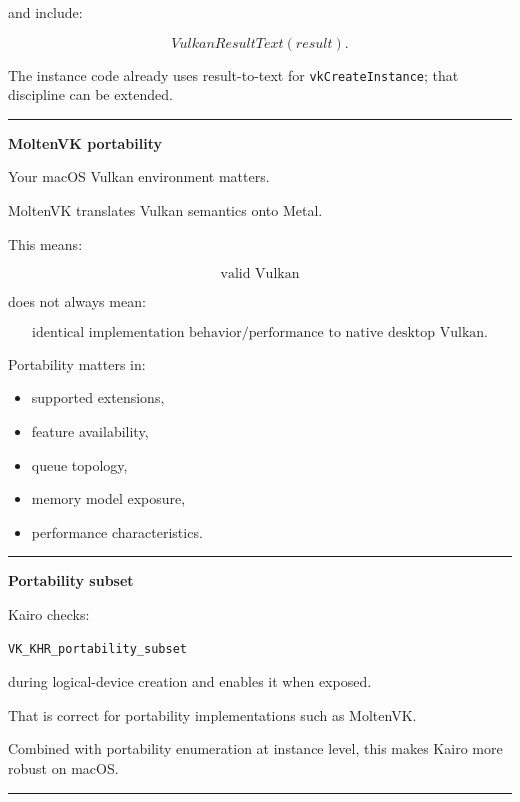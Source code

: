 and include:

\[
VulkanResultText(result).
\]

The instance code already uses result-to-text for \texttt{vkCreateInstance}; that discipline can be extended.

\begin{center}\rule{0.5\linewidth}{0.5pt}\end{center}

\textbf{MoltenVK portability}

Your macOS Vulkan environment matters.

MoltenVK translates Vulkan semantics onto Metal.

This means:

\[
\boxed{
\text{valid Vulkan}
}
\]

does not always mean:

\[
\boxed{
\text{identical implementation behavior/performance to native desktop Vulkan}.
}
\]

Portability matters in:

\begin{itemize}
\tightlist
\item
  supported extensions,
\item
  feature availability,
\item
  queue topology,
\item
  memory model exposure,
\item
  performance characteristics.
\end{itemize}

\begin{center}\rule{0.5\linewidth}{0.5pt}\end{center}

\textbf{Portability subset}

Kairo checks:

\begin{verbatim}
VK_KHR_portability_subset
\end{verbatim}

during logical-device creation and enables it when exposed.

That is correct for portability implementations such as MoltenVK.

Combined with portability enumeration at instance level, this makes Kairo more robust on macOS.

\begin{center}\rule{0.5\linewidth}{0.5pt}\end{center}

